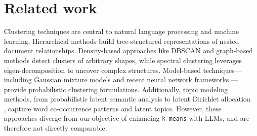 \section{Related work}
Clustering techniques are central to natural language processing and machine learning. Hierarchical methods \citep{johnson1967hierarchical, blashfield1978literature} build tree-structured representations of nested document relationships. Density-based approaches like DBSCAN \citep{ester1996density} and graph-based methods detect clusters of arbitrary shapes, while spectral clustering \citep{ng2001spectral} leverages eigen-decomposition to uncover complex structures. Model-based techniques—including Gaussian mixture models \citep{dempster1977maximum} and recent neural network frameworks \citep{zhou2019end, huang2014deep, yang2016joint, zhang2021supporting, xie2016unsupervised}—provide probabilistic clustering formulations. Additionally, topic modeling methods, from probabilistic latent semantic analysis \citep{hofmann2001unsupervised} to latent Dirichlet allocation \citep{blei2003latent}, capture word co-occurrence patterns and latent topics. However, these approaches diverge from our objective of enhancing \texttt{k-means} with LLMs, and are therefore not directly comparable.

